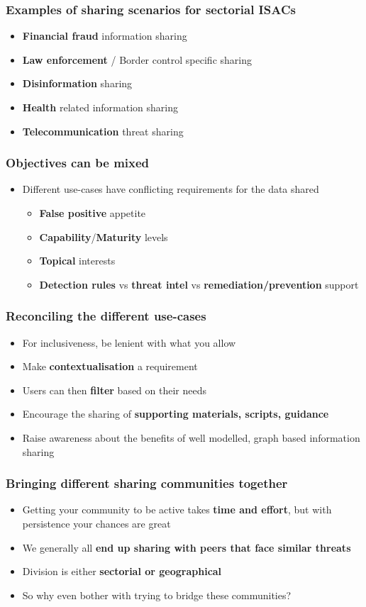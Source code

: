 \begin{frame}
	\frametitle{Examples of sharing scenarios for sectorial ISACs}
	\begin{itemize}
		\item \textbf{Financial fraud} information sharing
		\item \textbf{Law enforcement} / Border control specific sharing
		\item \textbf{Disinformation} sharing
		\item \textbf{Health} related information sharing
		\item \textbf{Telecommunication} threat sharing
	\end{itemize}
\end{frame}

\begin{frame}
	\frametitle{Objectives can be mixed}
	\begin{itemize}
		\item Different use-cases have conflicting requirements for the data shared
		\begin{itemize}
			\item \textbf{False positive} appetite
			\item \textbf{Capability}/\textbf{Maturity} levels
			\item \textbf{Topical} interests
			\item \textbf{Detection rules} vs \textbf{threat intel} vs \textbf{remediation/prevention} support
		\end{itemize}
	\end{itemize}
\end{frame}

\begin{frame}
	\frametitle{Reconciling the different use-cases}
	\begin{itemize}
		\item For inclusiveness, be lenient with what you allow
		\item Make \textbf{contextualisation} a requirement
		\item Users can then \textbf{filter} based on their needs
		\item Encourage the sharing of \textbf{supporting materials, scripts, guidance}
		\item Raise awareness about the benefits of well modelled, graph based information sharing
	\end{itemize}
\end{frame}

\begin{frame}
	\frametitle{Bringing different sharing communities together}
	\begin{itemize}
		\item Getting your community to be active takes \textbf{time and effort}, but with persistence your chances are great
		\item We generally all \textbf{end up sharing with peers that face similar threats}
		\item Division is either \textbf{sectorial or geographical}
		\item So why even bother with trying to bridge these communities?
	\end{itemize}
\end{frame}


